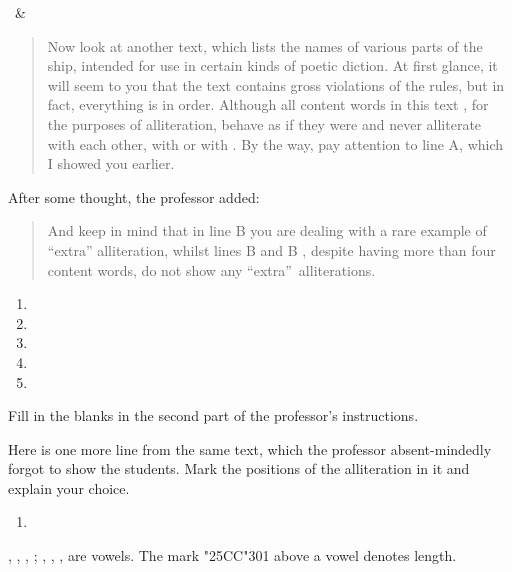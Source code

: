 \begin{refsection}
\begin{problem}{\langnameOldNorse}{\namePArkadiev\ \& \nameEGurevich}{}
\begin{assgts}
    \begin{quote}
    Now look at another text, which lists the names of various parts of the ship, intended for use in certain kinds of poetic diction. At first glance, it will seem to you that the text contains gross violations of the rules, but in fact, everything is in order. Although all content words in this text \pbblank, for the purposes of alliteration, \pbblank behave as if they were \pbblank{} and never alliterate with each other, with \pbblank{} or with \pbblank. By the way, pay attention to line A\pbblank, which I showed you earlier.
    \end{quote}
    After some thought, the professor added:
    \begin{quote}
    And keep in mind that in line B \pbblank{} you are dealing with a rare example of “extra” alliteration, whilst lines B \pbblank{} and B \pbblank, despite having more than four content words, do not show any “extra”\ alliterations.
    \end{quote}

\begin{enumerate}[label = B\arabic*.]
    \item {}
    \item {}
    \item {}
    \item {}
    \item {}
\end{enumerate}

\item Fill in the blanks in the second part of the professor's instructions.
\item Here is one more line from the same text, which the professor absent-mindedly forgot to show the students. Mark the positions of the alliteration in it and explain your choice. 
\begin{enumerate}[label = B\arabic*., start = 6]
    \item {}
\end{enumerate}
\end{assgts}

\begin{tblsWarning} 
, , , ; , , ,  are vowels. The mark {\char"25CC\char"301} above a vowel denotes length.
\end{tblsWarning}
\end{problem}


\end{refsection}
